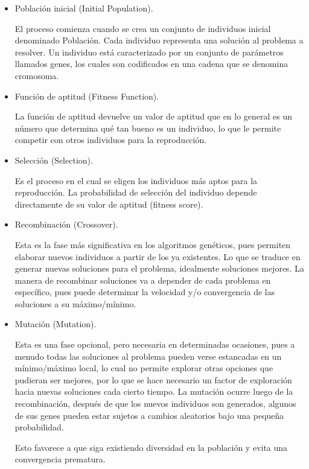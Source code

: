 \documentclass[12pt]{llncs}
\begin{document}
\begin{itemize}
    \item Población inicial (Initial Population).

    El proceso comienza cuando se crea un conjunto de individuos inicial denominado Población. Cada individuo representa una solución al problema a resolver. Un individuo está caracterizado por un conjunto de parámetros llamados genes, los cuales son codificados en una cadena que se denomina cromosoma.

    \item Función de aptitud (Fitness Function).

    La función de aptitud devuelve un valor de aptitud que en lo general es un número que determina qué tan bueno es un individuo, lo que le permite competir con otros individuos para la reproducción.
    
    \item Selección (Selection).

    Es el proceso en el cual se eligen los individuos más aptos para la reproducción. La probabilidad de selección del individuo depende directamente de su valor de aptitud (fitness score).

    \item Recombinación (Crossover).

    Esta es la fase más significativa en los algoritmos genéticos, pues permiten elaborar nuevos individuos a partir de los ya existentes. Lo que se traduce en generar nuevas soluciones para el problema, idealmente soluciones mejores. La manera de recombinar soluciones va a depender de cada problema en específico, pues puede determinar la velocidad y/o convergencia de las soluciones a su máximo/mínimo.

    \item Mutación (Mutation).

    Esta es una fase opcional, pero necesaria en determinadas ocasiones, pues a menudo todas las soluciones al problema pueden verse estancadas en un mínimo/máximo local, lo cual no permite explorar otras opciones que pudieran ser mejores, por lo que se hace necesario un factor de exploración hacia nuevas soluciones cada cierto tiempo. La mutación ocurre luego de la recombinación, después de que los nuevos individuos son generados, algunos de sus genes pueden estar sujetos a cambios aleatorios bajo una pequeña probabilidad.
    
    Esto favorece a que siga existiendo diversidad en la población y evita una convergencia prematura.
\end{itemize}
\end{document}
